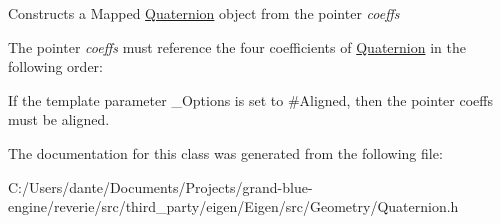 Constructs a Mapped \mbox{\hyperlink{class_eigen_1_1_quaternion}{Quaternion}} object from the pointer {\itshape coeffs} 

The pointer {\itshape coeffs} must reference the four coefficients of \mbox{\hyperlink{class_eigen_1_1_quaternion}{Quaternion}} in the following order\+: 
\begin{DoxyCode}{0}
\end{DoxyCode}


If the template parameter \+\_\+\+Options is set to \#\+Aligned, then the pointer coeffs must be aligned. 

The documentation for this class was generated from the following file\+:\begin{DoxyCompactItemize}
\item 
C\+:/\+Users/dante/\+Documents/\+Projects/grand-\/blue-\/engine/reverie/src/third\+\_\+party/eigen/\+Eigen/src/\+Geometry/Quaternion.\+h\end{DoxyCompactItemize}
